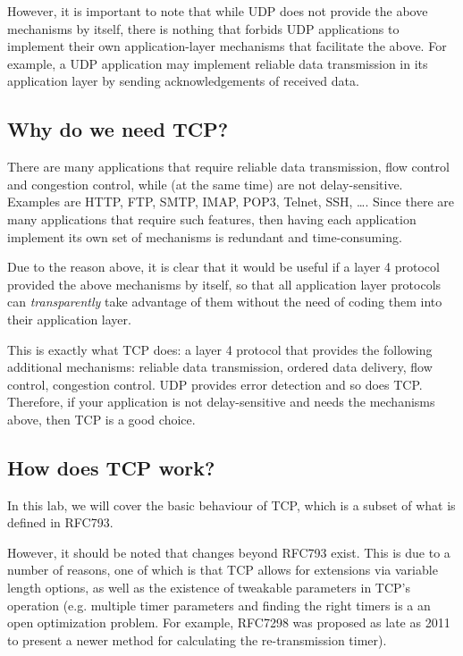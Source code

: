 \documentclass[pdftex,12pt,a4paper]{article}
\begin{document}
            However, it is important to note that while UDP does not provide
            the above mechanisms by itself, there is nothing that forbids UDP
            applications to implement their own application-layer mechanisms
            that facilitate the above. For example, a UDP application may
            implement reliable data transmission in its application layer by
            sending acknowledgements of received data.

        \subsection{Why do we need TCP?}
            There are many applications that require reliable data
            transmission, flow control and congestion control, while (at the
            same time) are not delay-sensitive. Examples are HTTP, FTP, SMTP,
            IMAP, POP3, Telnet, SSH, \ldots. Since there are many applications
            that require such features, then having each application implement
            its own set of mechanisms is redundant and time-consuming.

            Due to the reason above, it is clear that it would be useful if a
            layer 4 protocol provided the above mechanisms by itself, so that
            all application layer protocols can \emph{transparently} take
            advantage of them without the need of coding them into their
            application layer.

            This is exactly what TCP does: a layer 4 protocol that provides the
            following additional mechanisms: reliable data transmission,
            ordered data delivery, flow control, congestion control. UDP
            provides error detection and so does TCP. Therefore, if your
            application is not delay-sensitive and needs the mechanisms above,
            then TCP is a good choice.

        \subsection{How does TCP work?}\label{howdoestcpwork}
            In this lab, we will cover the basic behaviour of TCP, which is a
            subset of what is defined in RFC793. 

            However, it should be noted that changes beyond RFC793 exist. This
            is due to a number of reasons, one of which is that TCP allows for
            extensions via variable length options, as well as the existence of
            tweakable parameters in TCP's operation (e.g. multiple timer
            parameters and finding the right timers is a an open optimization
            problem. For example, RFC7298 was proposed as late as 2011 to
            present a newer method for calculating the re-transmission timer).
\end{document}
